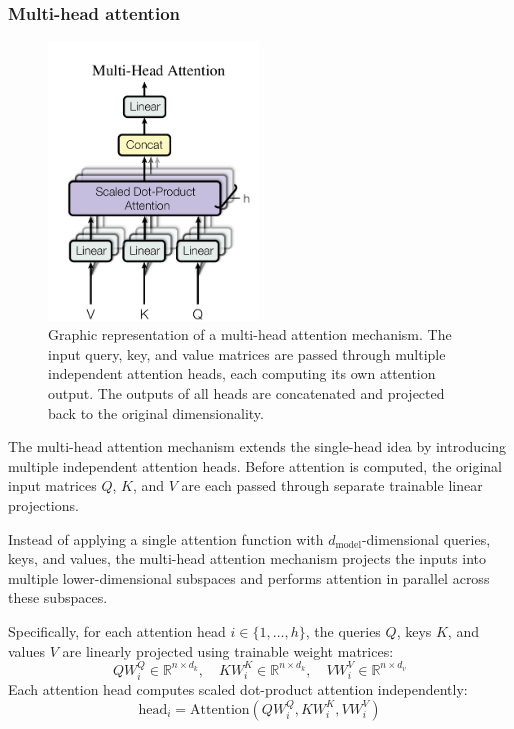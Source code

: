 \documentclass{pracalicmgr}
\begin{document}
\subsubsection{Multi-head attention}

\begin{figure}[h]
    \centering
    \includegraphics[width=0.5\textwidth]{src/multiHead.png}
    \caption{Graphic representation of a multi-head attention mechanism. The input query, key, and value matrices are passed through multiple independent attention heads, each computing its own attention output. The outputs of all heads are concatenated and projected back to the original dimensionality\cite{Vaswani2017Attention}.}
    \label{fig:multiHeadAttention}
\end{figure}

The multi-head attention mechanism extends the single-head idea by introducing multiple independent attention heads. Before attention is computed, the original input matrices \( Q \), \( K \), and \( V \) are each passed through separate trainable linear projections.

Instead of applying a single attention function with \( d_{\text{model}} \)-dimensional queries, keys, and values, the multi-head attention mechanism projects the inputs into multiple lower-dimensional subspaces and performs attention in parallel across these subspaces.

Specifically, for each attention head \( i \in \{1, \dots, h\} \), the queries \( Q \), keys \( K \), and values \( V \) are linearly projected using trainable weight matrices:
\[
QW_i^Q \in \mathbb{R}^{n \times d_k}, \quad KW_i^K \in \mathbb{R}^{n \times d_k}, \quad VW_i^V \in \mathbb{R}^{n \times d_v}
\]
Each attention head computes scaled dot-product attention independently:
\[
\text{head}_i = \text{Attention}(QW_i^Q, KW_i^K, VW_i^V)
\]
\end{document}
